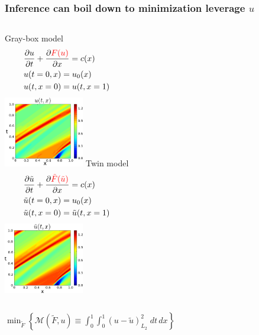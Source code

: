 \documentclass{beamer}
\begin{document}
\begin{frame}
    \frametitle{Inference can boil down to minimization \hfill \scriptsize{leverage $u$}}\small
    \begin{columns}
        \centering Gray-box model
        \begin{equation*}\begin{split}
            &\frac{\partial u}{\partial t}+ \frac{\partial \textcolor{red}{F(u)}}{\partial x} = c(x)\\
            &u(t=0,x) = u_0(x)\\
            &u(t,x=0) = u(t, x=1)
        \end{split}\end{equation*}
        \centering
        \includegraphics[width=3.5cm]{imag_1.png} 
        \centering Twin model
        \begin{equation*}\begin{split}
            &\frac{\partial \tilde{u}}{\partial t}+ \frac{\partial {\textcolor{red}{\tilde{F}
             (\tilde{u})}}}{\partial x} = c(x)\\
            &\tilde{u}(t=0,x) = u_0(x)\\
            &\tilde{u}(t,x=0) = \tilde{u}(t, x=1)
        \end{split}\end{equation*}
        \centering
        \includegraphics[width=3.5cm]{imag_2.png}
    \end{columns}
    \begin{center}
    \normalsize
    $
        \min_{\tilde{F}}\left\{ \mathcal{M}(\tilde{F}, u) \equiv \int_0^1\int_0^1\left(u-\tilde{u}\right)^2_{L_2}\; dt\,dx \right\}
    $
    \end{center}
\end{frame}
\end{document}
